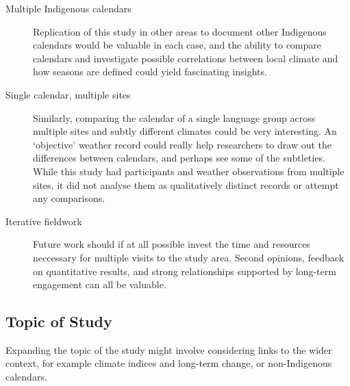 \begin{description}
\item[Multiple Indigenous calendars]
    Replication of this study in other areas to document other Indigenous calendars would be
    valuable in each case, and the ability to compare calendars and investigate
    possible correlations between local climate and how seasons are defined
    could yield fascinating insights.

\item[Single calendar, multiple sites]
    Similarly, comparing the calendar of a single language group across
    multiple sites and subtly different climates could be very interesting.
    An `objective' weather record could really help researchers to draw out
    the differences between calendars, and perhaps see some of the subtleties.
    While this study had participants and weather observations from multiple
    sites, it did not analyse them as qualitatively distinct records or
    attempt any comparisons.

\item[Iterative fieldwork]
    Future work should if at all possible invest the time and resources
    neccessary for multiple visits to the study area.  Second opinions,
    feedback on quantitative results, and strong relationships supported by
    long-term engagement can all be valuable.
\end{description}

\subsection{Topic of Study}
Expanding the topic of the study might involve considering links to the wider
context, for example climate indices and long-term change, or non-Indigenous
calendars.

